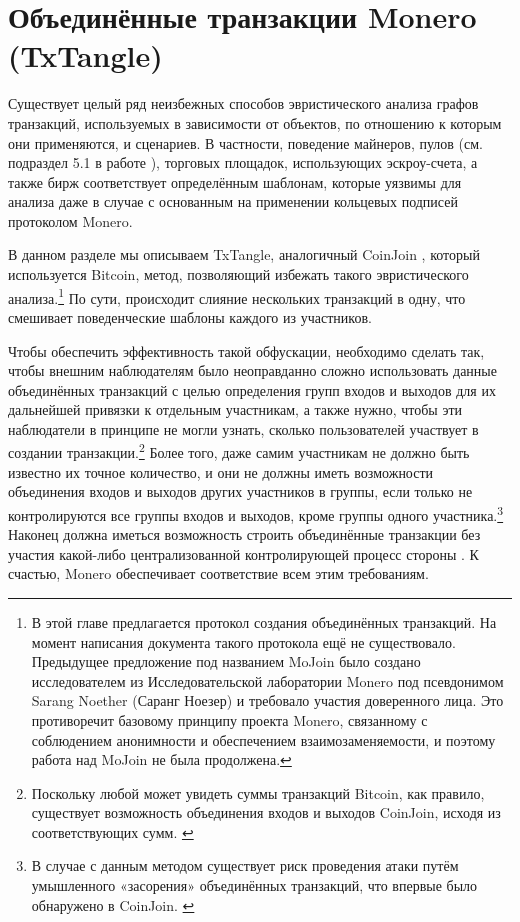 \chapter{Объединённые транзакции Monero (TxTangle)}
\label{chapter:txtangle}

Существует целый ряд неизбежных способов эвристического анализа графов транзакций, используемых в зависимости от объектов, по отношению к которым они применяются, и сценариев.  В частности, поведение майнеров, пулов (см. подраздел 5.1 в работе \cite{AnalysisOfLinkability}), торговых площадок, использующих эскроу-счета, а также бирж соответствует определённым шаблонам, которые уязвимы для анализа даже в случае с основанным на применении кольцевых подписей протоколом Monero.

В данном разделе мы описываем TxTangle, аналогичный CoinJoin \cite{coinjoin-wiki}, который используется Bitcoin, метод, позволяющий избежать такого эвристического анализа.\footnote{В этой главе предлагается протокол создания объединённых транзакций. На момент написания документа такого протокола ещё не существовало. Предыдущее предложение под названием MoJoin было создано исследователем из Исследовательской лаборатории Monero под псевдонимом Sarang Noether (Саранг Ноезер) и требовало участия доверенного лица. Это противоречит базовому принципу проекта Monero, связанному с соблюдением анонимности и обеспечением взаимозаменяемости, и поэтому работа над MoJoin не была продолжена.} По сути, происходит слияние нескольких транзакций в одну, что смешивает поведенческие шаблоны каждого из участников.

Чтобы обеспечить эффективность такой обфускации, необходимо сделать так, чтобы внешним наблюдателям было неоправданно сложно использовать данные объединённых транзакций с целью определения групп входов и выходов для их дальнейшей привязки к отдельным участникам, а также нужно, чтобы эти наблюдатели в принципе не могли узнать, сколько пользователей участвует в создании транзакции.\footnote{Поскольку любой может увидеть суммы транзакций Bitcoin, как правило, существует возможность объединения входов и выходов CoinJoin, исходя из соответствующих сумм. \cite{coinjoin-sudoku}} Более того, даже самим участникам не должно быть известно их точное количество, и они не должны иметь возможности объедине\-ния входов и выходов других участников в группы, если только не контролируются все группы входов и выходов, кроме группы одного участника.\footnote{В случае с данным методом существует риск проведения атаки путём умышленного «засорения» объединённых транзакций, что впервые было обнаружено в CoinJoin. \cite{coinjoin-pollution}} Наконец должна иметься воз\-можность строить объединённые транзакции без участия какой-либо централизованной кон\-тролирующей процесс стороны \cite{exa-blockchain-analysis}. К счастью, Monero обеспечивает соответствие всем этим требованиям.



